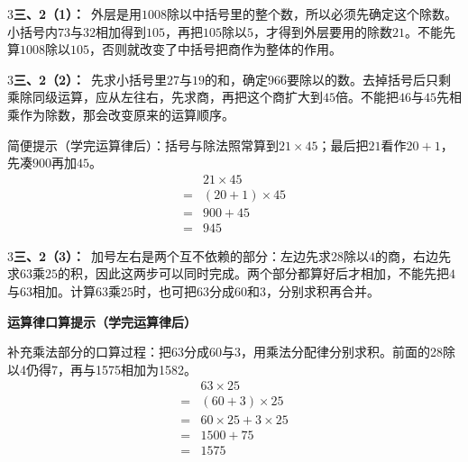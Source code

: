\documentclass[multi=snippet,border={5bp 20bp 5bp 5bp}]{standalone}
\newenvironment{snippet}[3]{\begin{minipage}{#1bp}\color{answerred}\fontsize{#2}{#3}\selectfont\raggedright}{\end{minipage}}
\begin{document}
\begin{snippet}{505}{11.5}{14}\begin{multicols}{3}\raggedcolumns \textbf{三、2（1）：}\ 外层是用\(1008\)\allowbreak 除以中括号里的整个数，所以必须先确定这个除数。小括号内\(73\)\allowbreak 与\(32\)\allowbreak 相加得到\(105\)\allowbreak ，再把\(105\)\allowbreak 除以\(5\)\allowbreak ，才得到外层要用的除数\(21\)\allowbreak 。不能先算\(1008\)\allowbreak 除以\(105\)\allowbreak ，否则就改变了中括号把商作为整体的作用。\end{multicols}\end{snippet}
\begin{snippet}{505}{11.5}{14}\begin{multicols}{3}\raggedcolumns \textbf{三、2（2）：}\ 先求小括号里\(27\)\allowbreak 与\(19\)\allowbreak 的和，确定\(966\)\allowbreak 要除以的数。去掉括号后只剩乘除同级运算，应从左往右，先求商，再把这个商扩大到\(45\)\allowbreak 倍。不能把\(46\)\allowbreak 与\(45\)\allowbreak 先相乘作为除数，那会改变原来的运算顺序。\par 简便提示（学完运算律后）：括号与除法照常算到\(21\times45\)\allowbreak ；最后把\(21\)\allowbreak 看作\(20+1\)\allowbreak ，先凑\(900\)\allowbreak 再加\(45\)\allowbreak 。\[\begin{aligned}&21\times45\\={}&(20+1)\times45\\={}&900+45\\={}&945\end{aligned}\]\end{multicols}\end{snippet}
\begin{snippet}{505}{11.5}{14}\begin{multicols}{3}\raggedcolumns \textbf{三、2（3）：}\ 加号左右是两个互不依赖的部分：左边先求\(28\)\allowbreak 除以\(4\)\allowbreak 的商，右边先求\(63\)\allowbreak 乘\(25\)\allowbreak 的积，因此这两步可以同时完成。两个部分都算好后才相加，不能先把\(4\)\allowbreak 与\(63\)\allowbreak 相加。计算\(63\)\allowbreak 乘\(25\)\allowbreak 时，也可把\(63\)\allowbreak 分成\(60\)\allowbreak 和\(3\)\allowbreak ，分别求积再合并。\par\textbf{运算律口算提示（学完运算律后）}\par 补充乘法部分的口算过程：把63分成60与3，用乘法分配律分别求积。前面的28除以4仍得7，再与1575相加为1582。\[\begin{aligned}&63\times25\\={}&(60+3)\times25\\={}&60\times25+3\times25\\={}&1500+75\\={}&1575\end{aligned}\]\end{multicols}\end{snippet}
\end{document}
